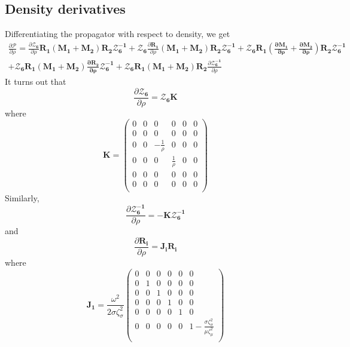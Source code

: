 \documentclass[a4paper,10pt]{article}
\begin{document}
\subsection{Density derivatives}
Differentiating the propagator with respect to density, we get
\begin{multline}
\frac{\partial \boldsymbol{\mathcal{P}}}{\partial \rho} =  \frac{\partial \boldsymbol{\mathcal{Z}_6}}{\partial \rho}\mathbf{R_1 (M_1+M_2)R_2}\boldsymbol{\mathcal{Z}}^\mathbf{-1}_\mathbf{6}+ \boldsymbol{\mathcal{Z}_6} \frac{\partial \mathbf{R_1}}{\partial \rho}\mathbf{ (M_1+M_2)R_2}\boldsymbol{\mathcal{Z}}^\mathbf{-1}_\mathbf{6}+ \boldsymbol{\mathcal{Z}_6} \mathbf{R_1 (\frac{\partial M_1}{\partial \rho}+\frac{\partial M_2}{\partial \rho})R_2}\boldsymbol{\mathcal{Z}}^\mathbf{-1}_\mathbf{6}\\+ \boldsymbol{\mathcal{Z}_6} \mathbf{R_1 (M_1+M_2) \frac{\partial R_2}{\partial \rho}}\boldsymbol{\mathcal{Z}}^\mathbf{-1}_\mathbf{6}+ \boldsymbol{\mathcal{Z}_6} \mathbf{R_1 (M_1+M_2)R_2}\frac{\partial \boldsymbol{\mathcal{Z}}^\mathbf{-1}_\mathbf{6}}{\partial \rho}
\end{multline}
It turns out that
\begin{equation}
\frac{\partial \boldsymbol{\mathcal{Z}_6}}{\partial \rho} =  \boldsymbol{\mathcal{Z}_6}\mathbf{K}
\end{equation}
where
\begin{equation}
\mathbf{K} = \left(
\begin{array}{cccccc}
 0 & 0 & 0 & 0 & 0 & 0 \\
 0 & 0 & 0 & 0 & 0 & 0 \\
 0 & 0 & -\frac{1}{\rho } & 0 & 0 & 0 \\
 0 & 0 & 0 & \frac{1}{\rho } & 0 & 0 \\
 0 & 0 & 0 & 0 & 0 & 0 \\
 0 & 0 & 0 & 0 & 0 & 0 \\
\end{array}
\right)
\end{equation}
Similarly,
\begin{equation}
\frac{\partial \boldsymbol{\mathcal{Z}}^\mathbf{-1}_\mathbf{6}}{\partial \rho} = -\mathbf{K}\boldsymbol{\mathcal{Z}}^\mathbf{-1}_\mathbf{6}
\end{equation}
and
\begin{equation}
\frac{\partial \mathbf{R_i}}{\partial \rho}=\mathbf{J_iR_i}
\end{equation}
where
\begin{equation}
\mathbf{J_1} = \frac{\omega^2}{2\sigma \zeta_\sigma^2}\left(
\begin{array}{cccccc}
 0 & 0 & 0 & 0 & 0 & 0 \\
 0 & 1 & 0 & 0 & 0 & 0 \\
 0 & 0 & 1 & 0 & 0 & 0 \\
 0 & 0 & 0 & 1 & 0 & 0 \\
 0 & 0 & 0 & 0 & 1 & 0 \\
 0 & 0 & 0 & 0 & 0 & 1- \frac{\sigma \zeta_\sigma^2}{\mu \zeta_\mu^2}\\
\end{array}
\right)
\end{equation}
\end{document}
